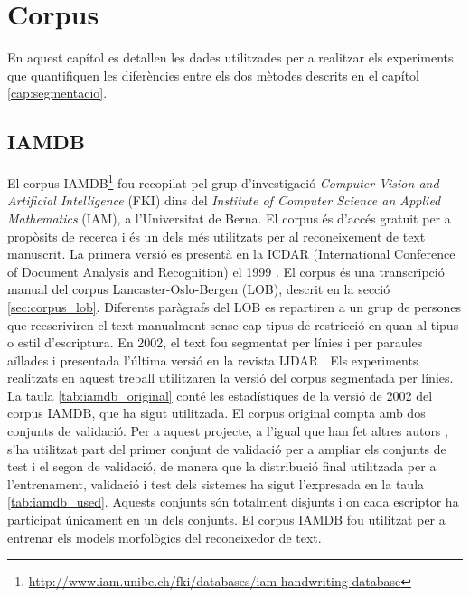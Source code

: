 \chapter{Corpus}
\label{cap:corpus}
En aquest capítol es detallen les dades utilitzades per a realitzar els experiments que quantifiquen les diferències entre els dos mètodes descrits en el capítol \ref{cap:segmentacio}.

\section{IAMDB}\label{sec:corpus_iamdb}
El corpus IAMDB\footnote{\url{http://www.iam.unibe.ch/fki/databases/iam-handwriting-database}} fou recopilat pel grup d'investigació \emph{Computer Vision and Artificial Intelligence} (FKI) dins del \emph{Institute of Computer Science an Applied Mathematics} (IAM), a l'Universitat de Berna. El corpus és d'accés gratuit per a propòsits de recerca i és un dels més utilitzats per al reconeixement de text manuscrit. La primera versió es presentà en la ICDAR (International Conference of Document Analysis and Recognition) el 1999 \cite{MB99}. El corpus és una transcripció manual del corpus Lancaster-Oslo-Bergen (LOB), descrit en la secció \ref{sec:corpus_lob}. Diferents paràgrafs del LOB es repartiren a un grup de persones que reescriviren el text manualment sense cap tipus de restricció en quan al tipus o estil d'escriptura. En 2002, el text fou segmentat per línies i per paraules aïllades \cite{ZB02} i presentada l'última versió en la revista IJDAR \cite{MB02}. Els experiments realitzats en aquest treball utilitzaren la versió del corpus segmentada per línies.\\

La taula \ref{tab:iamdb_original} conté les estadístiques de la versió de 2002 del corpus IAMDB, que ha sigut utilitzada. El corpus original compta amb dos conjunts de validació. Per a aquest projecte, a l'igual que han fet altres autors \cite{bertolami2008ensemble, graves2009novel, espana2011improving}, s'ha utilitzat part del primer conjunt de validació per a ampliar els conjunts de test i el segon de validació, de manera que la distribució final utilitzada per a l'entrenament, validació i test dels sistemes ha sigut l'expresada en la taula \ref{tab:iamdb_used}. Aquests conjunts són totalment disjunts i on cada escriptor ha participat únicament en un dels conjunts. El corpus IAMDB fou utilitzat per a entrenar els models morfològics del reconeixedor de text.\\

